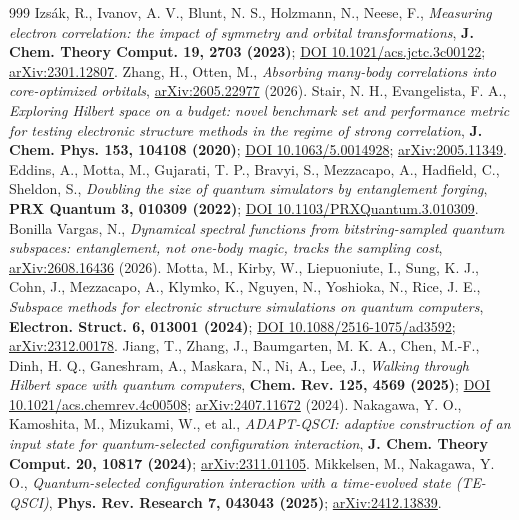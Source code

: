 \documentclass[onecolumn,a4paper]{quantumarticle}
\begin{document}
\begin{thebibliography}{999}
 Izs\'ak, R., Ivanov, A. V., Blunt, N. S., Holzmann, N., Neese, F., \emph{Measuring electron correlation: the impact of symmetry and orbital transformations}, \textbf{J. Chem. Theory Comput. 19, 2703 (2023)}; \href{https://doi.org/10.1021/acs.jctc.3c00122}{DOI 10.1021/acs.jctc.3c00122}; \href{https://arxiv.org/abs/2301.12807}{arXiv:2301.12807}.
 Zhang, H., Otten, M., \emph{Absorbing many-body correlations into core-optimized orbitals}, \href{https://arxiv.org/abs/2605.22977}{arXiv:2605.22977} (2026).
 Stair, N. H., Evangelista, F. A., \emph{Exploring Hilbert space on a budget: novel benchmark set and performance metric for testing electronic structure methods in the regime of strong correlation}, \textbf{J. Chem. Phys. 153, 104108 (2020)}; \href{https://doi.org/10.1063/5.0014928}{DOI 10.1063/5.0014928}; \href{https://arxiv.org/abs/2005.11349}{arXiv:2005.11349}.
 Eddins, A., Motta, M., Gujarati, T. P., Bravyi, S., Mezzacapo, A., Hadfield, C., Sheldon, S., \emph{Doubling the size of quantum simulators by entanglement forging}, \textbf{PRX Quantum 3, 010309 (2022)}; \href{https://doi.org/10.1103/PRXQuantum.3.010309}{DOI 10.1103/PRXQuantum.3.010309}.
 Bonilla Vargas, N., \emph{Dynamical spectral functions from bitstring-sampled quantum subspaces: entanglement, not one-body magic, tracks the sampling cost}, \href{https://arxiv.org/abs/2608.16436}{arXiv:2608.16436} (2026).
 Motta, M., Kirby, W., Liepuoniute, I., Sung, K. J., Cohn, J., Mezzacapo, A., Klymko, K., Nguyen, N., Yoshioka, N., Rice, J. E., \emph{Subspace methods for electronic structure simulations on quantum computers}, \textbf{Electron. Struct. 6, 013001 (2024)}; \href{https://doi.org/10.1088/2516-1075/ad3592}{DOI 10.1088/2516-1075/ad3592}; \href{https://arxiv.org/abs/2312.00178}{arXiv:2312.00178}.
 Jiang, T., Zhang, J., Baumgarten, M. K. A., Chen, M.-F., Dinh, H. Q., Ganeshram, A., Maskara, N., Ni, A., Lee, J., \emph{Walking through Hilbert space with quantum computers}, \textbf{Chem. Rev. 125, 4569 (2025)}; \href{https://doi.org/10.1021/acs.chemrev.4c00508}{DOI 10.1021/acs.chemrev.4c00508}; \href{https://arxiv.org/abs/2407.11672}{arXiv:2407.11672} (2024).
 Nakagawa, Y. O., Kamoshita, M., Mizukami, W., et al., \emph{ADAPT-QSCI: adaptive construction of an input state for quantum-selected configuration interaction}, \textbf{J. Chem. Theory Comput. 20, 10817 (2024)}; \href{https://arxiv.org/abs/2311.01105}{arXiv:2311.01105}.
 Mikkelsen, M., Nakagawa, Y. O., \emph{Quantum-selected configuration interaction with a time-evolved state (TE-QSCI)}, \textbf{Phys. Rev. Research 7, 043043 (2025)}; \href{https://arxiv.org/abs/2412.13839}{arXiv:2412.13839}.

\end{thebibliography}
\end{document}
